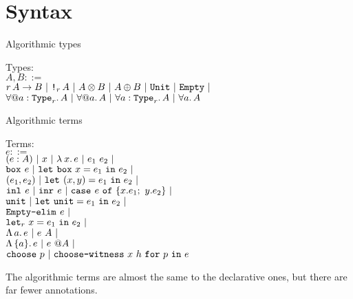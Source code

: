 \section{Syntax}

\begin{frame}{Algorithmic types}

Types: \\
$A, B ::=$ \\
\qquad $\Fun[r]{A}{B} \pipe \Box[r]{A} \pipe \Prod{A}{B} \pipe \Sum{A}{B} \pipe \Unit \pipe \Empty \pipe$ \\
\qquad $\ForallE{a}[r]{A} \pipe \ForallE{a}{A} \pipe \ForallI{a}[r]{A} \pipe \ForallI{a}{A}$

\end{frame}

\begin{frame}{Algorithmic terms}

Terms: \\
$e ::=$ \\
\qquad $\annot{e}{A} \pipe x \pipe \fun{x}{e} \pipe \app{e_1}{e_2} \pipe$ \\
\qquad $\boxintro{e} \pipe \boxelim{x}{e_1}{e_2} \pipe$ \\
\qquad $\pair{e_1}{e_2} \pipe \letpair{x}{y}{e_1}{e_2} \pipe$ \\
\qquad $\inl{e} \pipe \inr{e} \pipe \newcase{e}{x}{e_1}{y}{e_2} \pipe$ \\
\qquad $\unit \pipe \unitelim{e_1}{e_2} \pipe$ \\
\qquad $\emptyelim{e} \pipe$ \\
\qquad $\letin[r]{x}{e_1}{e_2} \pipe$ \\
\qquad $\tfun{a}{e} \pipe \tapp{e}{A} \pipe$ \\
\qquad $\itfun{a}{e} \pipe \itapp{e}{A} \pipe$ \\
\qquad $\texttt{choose}\ p \ |\  \texttt{choose-witness}\ x\ h\ \texttt{for}\ p\ \texttt{in}\ e$

\vspace{2em}

The algorithmic terms are almost the same to the declarative ones, but there are far fewer annotations.

\end{frame}

